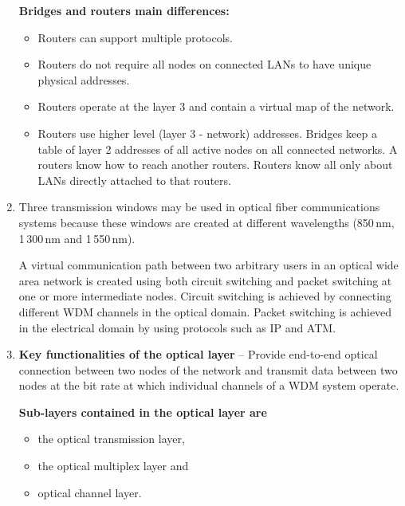 \documentclass[a4paper, 11pt]{article}
\begin{document}
\begin{enumerate}

			\textbf{Bridges and routers main differences:}
			\begin{itemize}
				\item
					Routers can support multiple protocols.

				\item
					Routers do not require all nodes on connected LANs to have unique physical addresses.

				\item
					Routers operate at the layer 3 and contain a virtual map of the network.

				\item
					Routers use higher level (layer 3 - network) addresses. Bridges keep a table of layer 2 addresses of all active
					nodes on all connected networks. A routers know how to reach another routers. Routers know all only about LANs
					directly attached to that routers.
			\end{itemize}

		\item %
			Three transmission windows may be used in optical fiber communications systems because these windows are created at different
			wavelengths (850\,nm, 1\,300\,nm and 1\,550\,nm).

			A virtual communication path between two arbitrary users in an optical wide area network is created using both circuit switching
			and packet switching at one or more intermediate nodes. Circuit switching is achieved by connecting different WDM channels in the
			optical domain. Packet switching is achieved in the electrical domain by using protocols such as IP and ATM.

		\item %
			\textbf{Key functionalities of the optical layer} -- Provide end-to-end optical connection between two nodes of the network and
			transmit data between two nodes at the bit rate at which individual channels of a WDM system operate.

			\textbf{Sub-layers contained in the optical layer are}
			\begin{itemize}
				\item the optical transmission layer,
				\item the optical multiplex layer and
				\item optical channel layer.
			\end{itemize}
	\end{enumerate}
\end{document}
